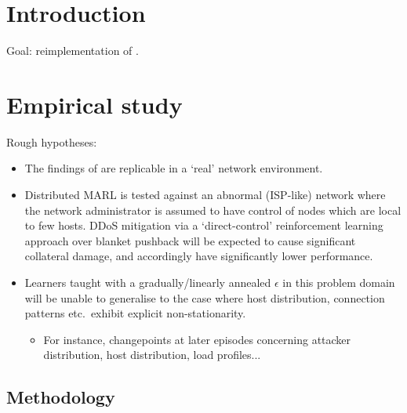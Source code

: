 \documentclass[10pt, a4paper]{article}
\title{\mytitle{}}
\author{Kyle A. Simpson}
\begin{document}

\maketitle

\section{Introduction}

Goal: reimplementation of \textcite{DBLP:journals/eaai/MalialisK15}.

\section{Empirical study}

Rough hypotheses:
\begin{itemize}
	\item The findings of \citeauthor{DBLP:journals/eaai/MalialisK15} are replicable in a `real' network environment.
	
	\item Distributed MARL is tested against an abnormal (ISP-like) network where the network administrator is assumed to have control of nodes which are local to few hosts.
	DDoS mitigation via a `direct-control' reinforcement learning approach over blanket pushback will be expected to cause significant collateral damage, and accordingly have significantly lower performance.
	
	\item Learners taught with a gradually/linearly annealed $\epsilon$ in this problem domain will be unable to generalise to the case where host distribution, connection patterns etc.\ exhibit explicit non-stationarity.
	\begin{itemize}
		\item For instance, changepoints at later episodes concerning attacker distribution, host distribution, load profiles...
	\end{itemize}
\end{itemize}

\subsection{Methodology}
\end{document}
